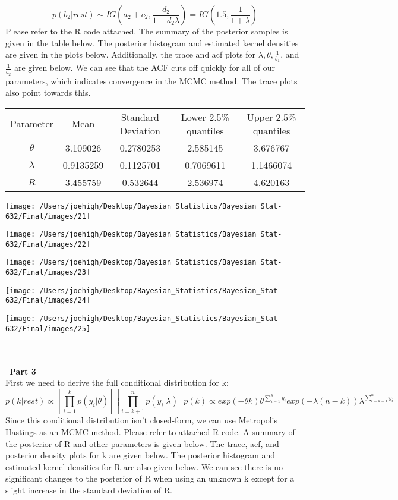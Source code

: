 \documentclass[10pt,a4paper]{article}
\begin{document}
$$p(b_2|rest) \sim IG(a_2+c_2,\frac{d_2}{1+d_2\lambda})=IG(1.5,\frac{1}{1+\lambda})$$
Please refer to the R code attached. The summary of the posterior samples is given in the table below. The posterior histogram and estimated kernel densities are given in the plots below. Additionally, the trace and acf plots for $\lambda, \theta, \frac{1}{b_1}$, and $\frac{1}{b_2}$ are given below. We can see that the ACF cuts off quickly for all of our parameters, which indicates convergence in the MCMC method. The trace plots also point towards this. 
\begin{center}
  \begin{tabular}{ |c|c|c|c|c| }
  \hline
  Parameter & Mean & Standard Deviation & Lower 2.5\% quantiles & Upper 2.5\% quantiles  \\ 
  $\theta$ & 3.109026 & 0.2780253 & 2.585145 & 3.676767 \\ 
  $\lambda$ & 0.9135259 & 0.1125701 & 0.7069611 & 1.1466074 \\
  $R$ & 3.455759 & 0.532644 & 2.536974 & 4.620163 \\
  \hline
  \end{tabular}
  \end{center}
  
\centerline{\texttt{[image: /Users/joehigh/Desktop/Bayesian\_Statistics/Bayesian\_Stat-632/Final/images/21]}}
\centerline{\texttt{[image: /Users/joehigh/Desktop/Bayesian\_Statistics/Bayesian\_Stat-632/Final/images/22]}}\centerline{\texttt{[image: /Users/joehigh/Desktop/Bayesian\_Statistics/Bayesian\_Stat-632/Final/images/23]}}
\centerline{\texttt{[image: /Users/joehigh/Desktop/Bayesian\_Statistics/Bayesian\_Stat-632/Final/images/24]}}
\centerline{\texttt{[image: /Users/joehigh/Desktop/Bayesian\_Statistics/Bayesian\_Stat-632/Final/images/25]}}
\text{}\\
\\\
\textbf{Part 3}\\
First we need to derive the full conditional distribution for k:\\
$$p(k|rest)\propto [\prod_{i=1}^{k}p(y_i|\theta)][\prod_{i=k+1}^{n}p(y_i|\lambda)]p(k)\propto exp(-\theta k)\theta^{\sum_{i=1}^{k}y_i}exp(-\lambda(n-k))\lambda^{\sum_{i=k+1}^{n}y_i} $$
Since this conditional distribution isn't closed-form, we can use Metropolis Hastings as an MCMC method. Please refer to attached R code. A summary of the posterior of R and other parameters is given below. The trace, acf, and posterior density plots for k are given below. The posterior histogram and estimated kernel densities for R are also given below. We can see there is no significant changes to the posterior of R when using an unknown k except for a slight increase in the standard deviation of R.
\end{document}
